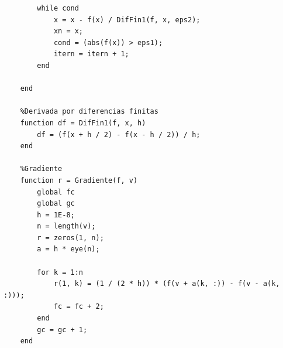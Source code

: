\documentclass[12pt]{article}
\begin{document}
\begin{lstlisting}
        while cond
            x = x - f(x) / DifFin1(f, x, eps2);
            xn = x;
            cond = (abs(f(x)) > eps1);
            itern = itern + 1;
        end
    
    end
    
    %Derivada por diferencias finitas
    function df = DifFin1(f, x, h)
        df = (f(x + h / 2) - f(x - h / 2)) / h;
    end
    
    %Gradiente
    function r = Gradiente(f, v)
        global fc
        global gc
        h = 1E-8; 
        n = length(v); 
        r = zeros(1, n); 
        a = h * eye(n); 
    
        for k = 1:n 
            r(1, k) = (1 / (2 * h)) * (f(v + a(k, :)) - f(v - a(k, :)));
            fc = fc + 2;
        end
        gc = gc + 1;
    end    
\end{lstlisting}






\end{document}
